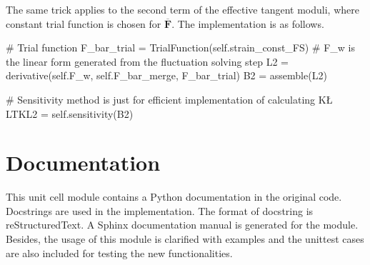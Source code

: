 The same trick applies to the second term of the effective tangent moduli, where constant trial function is chosen for $\overbar{\mathbf{F}}$. The implementation is as follows. 
\begin{python}
# Trial function
F_bar_trial = TrialFunction(self.strain_const_FS)
# F_w is the linear form generated from the fluctuation solving step
L2 = derivative(self.F_w, self.F_bar_merge, F_bar_trial)
B2 = assemble(L2)

# Sensitivity method is just for efficient implementation of calculating K\L
LTKL2 = self.sensitivity(B2)
\end{python}

\section{Documentation}
This unit cell module contains a Python documentation in the original code. Docstrings are used in the implementation. The format of docstring is reStructuredText. A Sphinx documentation manual is generated for the module. Besides, the usage of this module is clarified with examples and the unittest cases are also included for testing the new functionalities.

%
